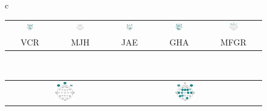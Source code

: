 \documentclass[12pt,a4paper]{mitthesis}
\begin{document}
\begin{figure}
\centering
\begin{tabular}{c}
\begin{tabular}{ccccc}
\includegraphics[width=0.17\textwidth]{./img_diagramas/cabecita_VCR.pdf} &
\includegraphics[width=0.17\textwidth]{./img_diagramas/cabecita_MJH.pdf} &
\includegraphics[width=0.17\textwidth]{./img_diagramas/cabecita_JAE.pdf} &
\includegraphics[width=0.17\textwidth]{./img_diagramas/cabecita_GHA.pdf} &
\includegraphics[width=0.17\textwidth]{./img_diagramas/cabecita_MFGR.pdf} \\
VCR & MJH & JAE & GHA & MFGR
\end{tabular}
\\
\begin{tabular}{cccc}
\includegraphics[width=0.17\textwidth]{./img_diagramas/cabecita_CLO.pdf} &
\includegraphics[width=0.17\textwidth]{./img_diagramas/cabecita_RLO.pdf} &

\end{tabular}
\end{tabular}
\end{figure}
\end{document}
